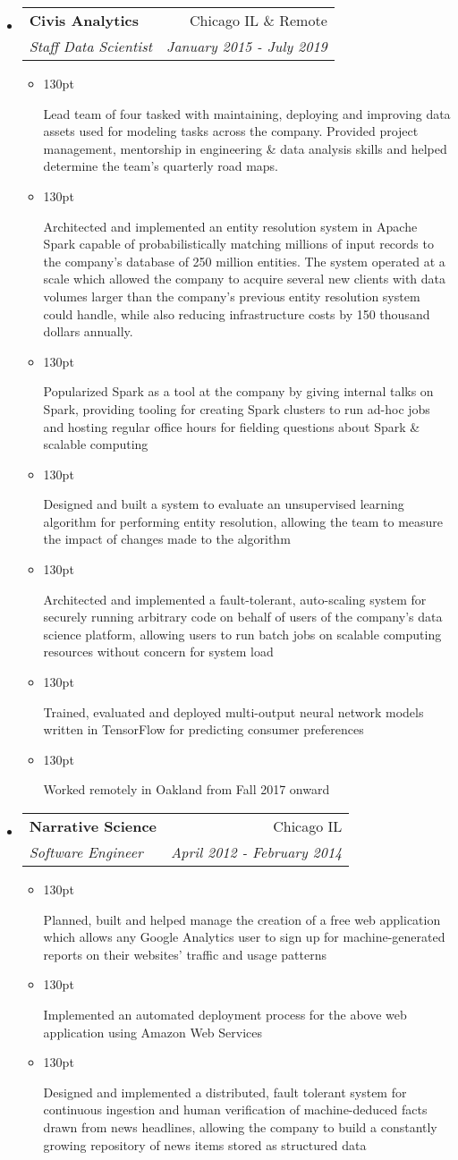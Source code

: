 \documentclass[letterpaper,10pt]{article}
\makeatletter
\newcommand{\resumeItem}[1]{
  \item{
    \begin{adjustwidth}{}{130pt}
    #1
    \end{adjustwidth}
  }
}
\newcommand{\resumeSubheading}[4]{
  \vspace{-1pt}\item[]
    \begin{tabular*}{0.97\textwidth}{l@{\extracolsep{\fill}}r}
      \textbf{#1} & #2 \\
      \textit{#3} & \textit{#4} \\
    \end{tabular*}\vspace{-5pt}
}
\makeatother
\begin{document}
\begin{itemize}[leftmargin=*]
    \resumeSubheading
      {Civis Analytics}
      {Chicago IL \& Remote}
      {Staff Data Scientist}
      {January 2015 - July 2019}
    \begin{itemize}
      \resumeItem{
        Lead team of four tasked with maintaining, deploying and
        improving data assets used for modeling tasks across the
        company. Provided project management, mentorship in
        engineering \& data analysis skills and helped determine the
        team's quarterly road maps.
      }
      \resumeItem{
        Architected and implemented an entity resolution
        system in Apache Spark capable of probabilistically
        matching millions of input records to the company's
        database of 250 million entities.
        The system operated at a scale which allowed the company
        to acquire several new clients with data volumes larger
        than the company's previous entity resolution system could
        handle, while also reducing infrastructure costs by 150
        thousand dollars annually.
      }
      \resumeItem{
        Popularized Spark as a tool at the company by giving
        internal talks on Spark, providing tooling for creating
        Spark clusters to run ad-hoc jobs and hosting regular
        office hours for fielding questions about Spark \&
        scalable computing
      }
      \resumeItem{
        Designed and built a system to evaluate an unsupervised
        learning algorithm for performing entity resolution,
        allowing the team to measure the impact of changes made to
        the algorithm
      }
      \resumeItem{
        Architected and implemented a fault-tolerant,
        auto-scaling system for securely running arbitrary code on
        behalf of users of the company's data science platform,
        allowing users to run batch jobs on scalable computing
        resources without concern for system load
      }
      \resumeItem{
        Trained, evaluated and deployed multi-output neural
        network models written in TensorFlow for predicting
        consumer preferences
      }
      \resumeItem{
        Worked remotely in Oakland from Fall 2017 onward
      }
    \end{itemize}

    \resumeSubheading
      {Narrative Science}
      {Chicago IL}
      {Software Engineer}
      {April 2012 - February 2014}
    \begin{itemize}
      \resumeItem{
        Planned, built and helped manage the creation of a
        free web application which allows any Google Analytics
        user to sign up for machine-generated reports on their
        websites' traffic and usage patterns
      }
      \resumeItem{
        Implemented an automated deployment process for the
        above web application using Amazon Web Services
      }
      \resumeItem{
        Designed and implemented a distributed, fault tolerant
        system for continuous ingestion and human verification of
        machine-deduced facts drawn from news headlines, allowing
        the company to build a constantly growing repository of news
        items stored as structured data
      }
    \end{itemize}


\end{itemize}
\end{document}
